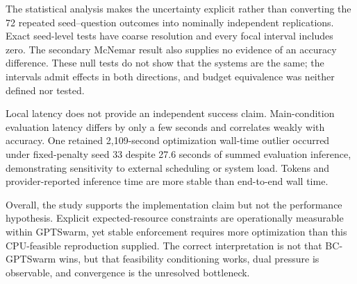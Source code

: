 The statistical analysis makes the uncertainty explicit rather than converting the 72 repeated seed--question outcomes into nominally independent replications. Exact seed-level tests have coarse resolution and every focal interval includes zero. The secondary McNemar result also supplies no evidence of an accuracy difference. These null tests do not show that the systems are the same; the intervals admit effects in both directions, and budget equivalence was neither defined nor tested.

Local latency does not provide an independent success claim. Main-condition evaluation latency differs by only a few seconds and correlates weakly with accuracy. One retained 2,109-second optimization wall-time outlier occurred under fixed-penalty seed 33 despite 27.6 seconds of summed evaluation inference, demonstrating sensitivity to external scheduling or system load. Tokens and provider-reported inference time are more stable than end-to-end wall time.

Overall, the study supports the implementation claim but not the performance hypothesis. Explicit expected-resource constraints are operationally measurable within GPTSwarm, yet stable enforcement requires more optimization than this CPU-feasible reproduction supplied. The correct interpretation is not that BC-GPTSwarm wins, but that feasibility conditioning works, dual pressure is observable, and convergence is the unresolved bottleneck.
